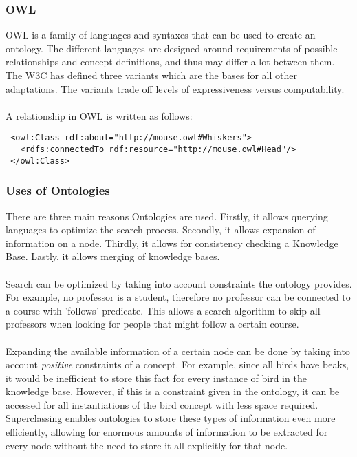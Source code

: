 \documentclass{article}
\begin{document}
 
 \subsubsection{OWL}
 OWL is a family of languages and syntaxes that can be used to create an ontology. The different languages are designed around requirements of possible relationships and concept definitions, and thus may differ a lot between them. The W3C has defined three variants which are the bases for all other adaptations. The variants trade off levels of expressiveness versus computability.
 \paragraph{}
 A relationship in OWL is written as follows:
 
 \lstset{language=XML}
 \begin{lstlisting}
 <owl:Class rdf:about="http://mouse.owl#Whiskers">
   <rdfs:connectedTo rdf:resource="http://mouse.owl#Head"/>
 </owl:Class>
 \end{lstlisting}
 
 \subsubsection{Uses of Ontologies}
 There are three main reasons Ontologies are used. Firstly, it allows querying languages to optimize the search process. Secondly, it allows expansion of information on a node. Thirdly, it allows for consistency checking a Knowledge Base. Lastly, it allows merging of knowledge bases.
 \paragraph{}
 Search can be optimized by taking into account constraints the ontology provides. For example, no professor is a student, therefore no professor can be connected to a course with 'follows' predicate. This allows a search algorithm to skip all professors when looking for people that might follow a certain course.
 \paragraph{}
 Expanding the available information of a certain node can be done by taking into account \textit{positive} constraints of a concept. For example, since all birds have beaks, it would be inefficient to store this fact for every instance of bird in the knowledge base. However, if this is a constraint given in the ontology, it can be accessed for all instantiations of the bird concept with less space required. Superclassing enables ontologies to store these types of information even more efficiently, allowing for enormous amounts of information to be extracted for every node without the need to store it all explicitly for that node.
\end{document}

